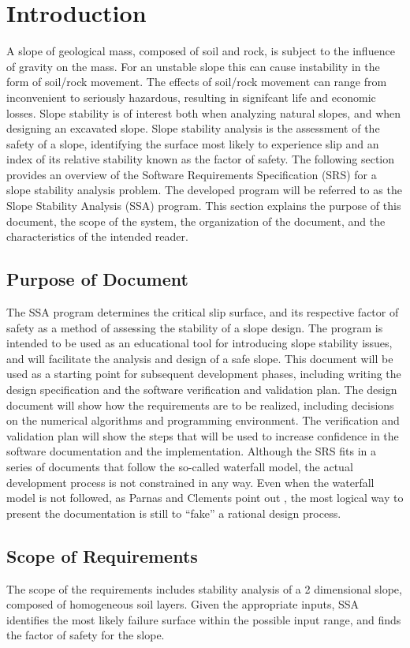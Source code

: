 \documentclass[12pt]{article}
\begin{document}
\section{Introduction}
\label{Sec:Intro}
A slope of geological mass, composed of soil and rock, is subject to the influence of gravity on the mass. For an unstable slope this can cause instability in the form of soil/rock movement. The effects of soil/rock movement can range from inconvenient to seriously hazardous, resulting in signifcant life and economic losses. Slope stability is of interest both when analyzing natural slopes, and when designing an excavated slope. Slope stability analysis is the assessment of the safety of a slope, identifying the surface most likely to experience slip and an index of its relative stability known as the factor of safety.
The following section provides an overview of the Software Requirements Specification (SRS) for a slope stability analysis problem. The developed program will be referred to as the Slope Stability Analysis (SSA) program. This section explains the purpose of this document, the scope of the system, the organization of the document, and the characteristics of the intended reader.
\subsection{Purpose of Document}
\label{Sec:DocPurpose}
The SSA program determines the critical slip surface, and its respective factor of safety as a method of assessing the stability of a slope design. The program is intended to be used as an educational tool for introducing slope stability issues, and will facilitate the analysis and design of a safe slope.
This document will be used as a starting point for subsequent development phases, including writing the design specification and the software verification and validation plan. The design document will show how the requirements are to be realized, including decisions on the numerical algorithms and programming environment. The verification and validation plan will show the steps that will be used to increase confidence in the software documentation and the implementation. Although the SRS fits in a series of documents that follow the so-called waterfall model, the actual development process is not constrained in any way. Even when the waterfall model is not followed, as Parnas and Clements point out \cite{parnasClements1986}, the most logical way to present the documentation is still to ``fake'' a rational design process.
\subsection{Scope of Requirements}
\label{Sec:ReqsScope}
The scope of the requirements includes stability analysis of a 2 dimensional slope, composed of homogeneous soil layers. Given the appropriate inputs, SSA identifies the most likely failure surface within the possible input range, and finds the factor of safety for the slope.
\end{document}
